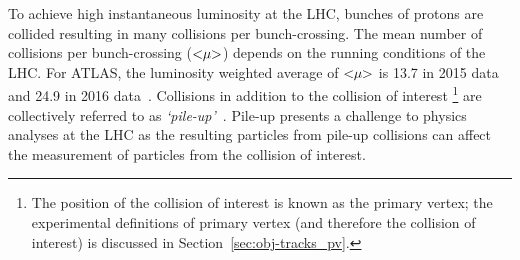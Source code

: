 
To achieve high instantaneous luminosity at the LHC, bunches of protons are collided resulting in many collisions per bunch-crossing.
The mean number of collisions per bunch-crossing ($<\hspace{-3pt}\mu\hspace{-3pt}>$) depends on the running conditions of the LHC.
For ATLAS, the luminosity weighted average of $<\hspace{-3pt}\mu\hspace{-3pt}>$ is 13.7 in 2015 data and 24.9 in 2016 data~\cite{det-ATLAS_lumi_twiki}.
Collisions in addition to the collision of interest
\footnote{ The position of the collision of interest is known as the primary vertex;
  the experimental definitions of primary vertex (and therefore the collision of interest) is discussed in Section~\ref{sec:obj-tracks_pv}.}
are collectively referred to as \textit{`pile-up'}~\cite{det-pileup}.
Pile-up presents a challenge to physics analyses at the LHC
as the resulting particles from pile-up collisions can affect the measurement of particles from the collision of interest.

